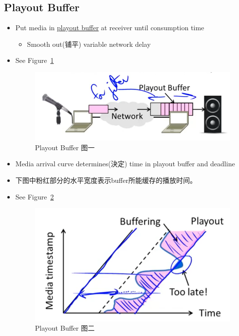 \documentclass[12pt]{ctexart}   %
\begin{document}
	\subsection{Playout Buffer}
	\begin{itemize}
		\item Put media in \underline{playout buffer} at receiver until consumption time
		\begin{itemize}
			\item Smooth out(铺平) variable network delay
		\end{itemize}
		\item See Figure~\ref{fig:9-2-6}
		  
		 \begin{figure}[h!] %
		\centering
		 \includegraphics[scale=0.7]{images/9-2-6}
		\caption{ Playout Buffer 图一 }
		 \label{fig:9-2-6}
		 \end{figure}
		
		\item Media arrival curve determines(決定) time in playout buffer and deadline
		\item 下图中粉红部分的水平宽度表示buffer所能缓存的播放时间。
		\item See Figure~\ref{fig:9-2-7}
		  
		 \begin{figure}[h!] %
		\centering
		 \includegraphics[scale=0.7]{images/9-2-7}
		\caption{ Playout Buffer 图二 }
		 \label{fig:9-2-7}
		 \end{figure}
		 

\end{itemize}
\end{document}
